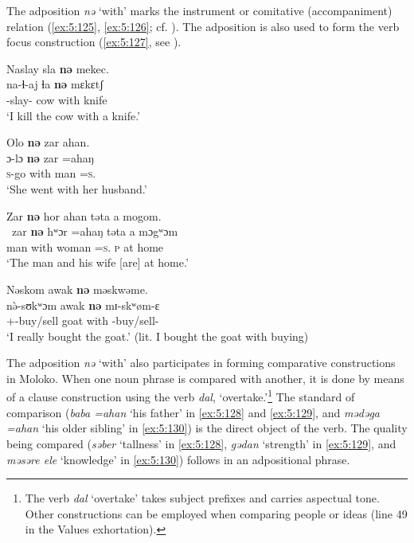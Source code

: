 The adposition \textit{nə} ‘with’ marks the instrument  or comitative (accompaniment) relation (\ref{ex:5:125}, \ref{ex:5:126}; cf. ). The adposition is also used to form the verb focus construction (\ref{ex:5:127}, see ).

\ea \label{ex:5:124}
Naslay  sla  \textbf{nə} mekec.\\
\gll  na-ɬ{}-aj  ɬa  \textbf{nə} mɛkɛtʃ\\
      {\oneS}-slay{}-{\CL}  cow  with  knife\\
\glt  ‘I kill the cow with a knife.’
\z

\ea \label{ex:5:125}
Olo  \textbf{nə}  zar  ahan.\\
\gll  ɔ{}-lɔ     \textbf{nə}   zar   =ahaŋ\\
      \textsc{s}-go  with  man  =\textsc{s}.{\POSS}\\
\glt  ‘She went with her husband.’
\z

\ea \label{ex:5:126}
Zar  \textbf{nə}  hor  ahan  təta  a  mogom.\\
\gll  \ zar    \textbf{nə}  hʷɔr  =ahaŋ    təta  a  mɔgʷɔm\\
      man    with  woman  =\textsc{s}.{\POSS}  \textsc{p}  at  home\\
\glt  ‘The man and his wife [are] at home.’ 
\z

\clearpage
\ea \label{ex:5:127}
Nəskom  awak  \textbf{nə}  məskwəme.\\
\gll  n\`{ə}-sʊkʷɔm    awak  \textbf{nə}  mɪ-skʷøm-ɛ\\
      {\oneS}+{\PFV}-buy/sell  goat  with  {\NOM}{}-buy/sell-{\CL}\\
\glt  ‘I really bought the goat.’ (lit. I bought the goat with buying)
\z

The adposition \textit{nə} ‘with’ also participates in forming comparative constructions in Moloko. When one noun phrase is compared with another, it is done by means of a clause construction using the verb \textit{dal}, ‘overtake.’\footnote{The verb \textit{dal} ‘overtake’ takes subject prefixes and carries aspectual tone. Other constructions can be employed when comparing people  or ideas (line 49 in the Values exhortation).} The standard of comparison (\textit{baba =ahan} ‘his father’ in \ref{ex:5:128} and \ref{ex:5:129}, and \textit{mədəga =ahan} ‘his older sibling’ in \ref{ex:5:130}) is the direct object of the verb. The quality being compared (\textit{səber} ‘tallness’ in \ref{ex:5:128}, \textit{gədan} ‘strength’ in \ref{ex:5:129}, and \textit{məsəre ele} ‘knowledge’ in \ref{ex:5:130}) follows in an adpositional phrase.  


